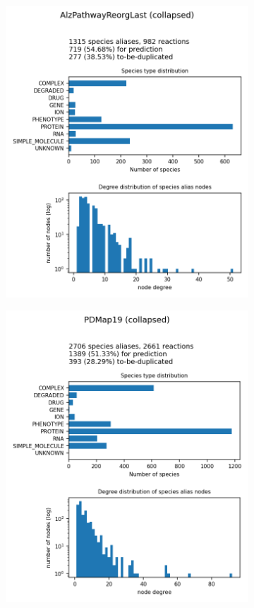 \documentclass[
	fontsize=10pt, %
	twoside=true, %
	secnumdepth=1, %
  toc=indentunnumbered %
]{kaobook}
\begin{document}
\begin{figure}[h]
  \centering
  \begin{subfigure}{0.32\textwidth}
    \includegraphics[width=\linewidth]{generated/AlzPathwayReorgLast.png}
  \end{subfigure} 
  \begin{subfigure}{0.32\textwidth}
    \includegraphics[width=\linewidth]{generated/PDMap19.png}

\end{subfigure}
\end{figure}
\end{document}
